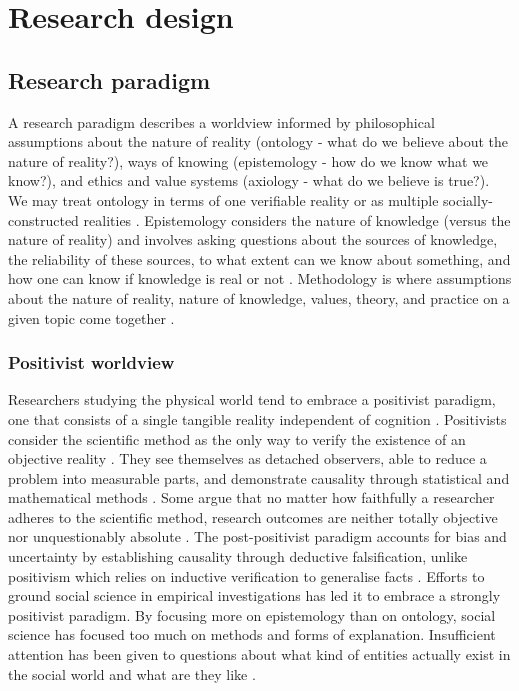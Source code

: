 \section{Research design}

\subsection{Research paradigm}

A research paradigm describes a worldview informed by philosophical assumptions about the nature of reality (ontology - what do we believe about the nature of reality?), ways of knowing (epistemology - how do we know what we know?), and ethics and value systems (axiology - what do we believe is true?). We may treat ontology in terms of one verifiable reality or as multiple socially-constructed realities \citep{chilisa2012selecting}. Epistemology considers the nature of knowledge (versus the nature of reality) and involves asking questions about the sources of knowledge, the reliability of these sources, to what extent can we know about something, and how one can know if knowledge is real or not \citep{patton2002qualitative}. Methodology is where assumptions about the nature of reality, nature of knowledge, values, theory, and practice on a given topic come together \citep{chilisa2012selecting}. 

\subsubsection{Positivist worldview}

Researchers studying the physical world tend to embrace a positivist paradigm, one that consists of a single tangible reality independent of cognition \citep{van2007engaged}. Positivists consider the scientific method as the only way to verify the existence of an objective reality \citep{creswell2011designing}. They see themselves as detached observers, able to reduce a problem into measurable parts, and demonstrate causality through statistical and mathematical methods \citep{easterby2015management}. Some argue that no matter how faithfully a researcher adheres to the scientific method, research outcomes are neither totally objective nor unquestionably absolute \citep[][p. 40]{crotty1998foundations}. The post-positivist paradigm accounts for bias and uncertainty by establishing causality through deductive falsification, unlike positivism which relies on inductive verification to generalise facts \citep{van2007engaged,chilisa2012selecting}. Efforts to ground social science in empirical investigations has led it to embrace a strongly positivist paradigm. By focusing more on epistemology than on ontology, social science has focused too much on methods and forms of explanation. Insufficient attention has been given to questions about what kind of entities actually exist in the social world and what are they like \citep{archer2016what}. 

